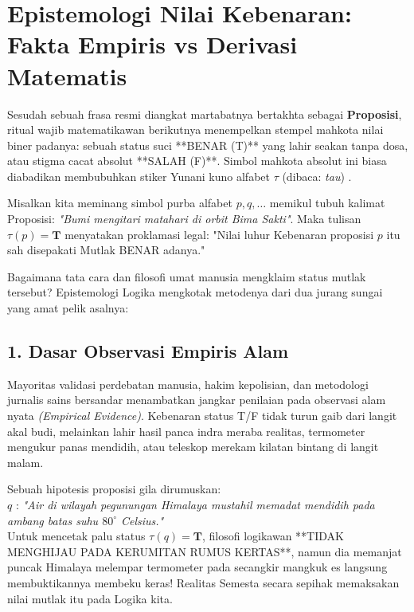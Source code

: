 \section{Epistemologi Nilai Kebenaran: Fakta Empiris vs Derivasi Matematis}

Sesudah sebuah frasa resmi diangkat martabatnya bertakhta sebagai \textbf{Proposisi}, ritual wajib matematikawan berikutnya menempelkan stempel mahkota nilai biner padanya: sebuah status suci **BENAR (T)** yang lahir seakan tanpa dosa, atau stigma cacat absolut **SALAH (F)**. Simbol mahkota absolut ini biasa diabadikan membubuhkan stiker Yunani kuno alfabet $\tau$ (dibaca: \textit{tau}) \cite{rosen2019}.

Misalkan kita meminang simbol purba alfabet $p, q, \dots$ memikul tubuh kalimat Proposisi: \textit{"Bumi mengitari matahari di orbit Bima Sakti"}. Maka tulisan $\tau(p) = \mathbf{T}$ menyatakan proklamasi legal: "Nilai luhur Kebenaran proposisi $p$ itu sah disepakati Mutlak BENAR adanya."

Bagaimana tata cara dan filosofi umat manusia mengklaim status mutlak tersebut? Epistemologi Logika mengkotak metodenya dari dua jurang sungai yang amat pelik asalnya:

\subsection{1. Dasar Observasi Empiris Alam}

Mayoritas validasi perdebatan manusia, hakim kepolisian, dan metodologi jurnalis sains bersandar menambatkan jangkar penilaian pada observasi alam nyata \textit{(Empirical Evidence)}. Kebenaran status T/F tidak turun gaib dari langit akal budi, melainkan lahir hasil panca indra meraba realitas, termometer mengukur panas mendidih, atau teleskop merekam kilatan bintang di langit malam.

\begin{contoh}
Sebuah hipotesis proposisi gila dirumuskan: \\ 
\indent $q$ : \textit{"Air di wilayah pegunungan Himalaya mustahil memadat mendidih pada ambang batas suhu $80^\circ$ Celsius."}\\
Untuk mencetak palu status $\tau(q) = \mathbf{T}$, filosofi logikawan **TIDAK MENGHIJAU PADA KERUMITAN RUMUS KERTAS**, namun dia memanjat puncak Himalaya melempar termometer pada secangkir mangkuk es langsung membuktikannya membeku keras! Realitas Semesta secara sepihak memaksakan nilai mutlak itu pada Logika kita.
\end{contoh}

